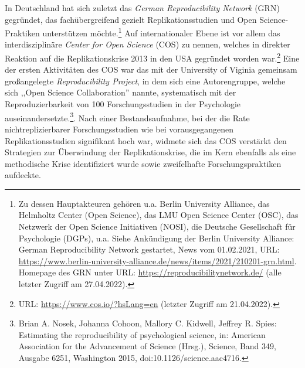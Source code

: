 In Deutschland hat sich zuletzt das \textit{German Reproducibility Network} (GRN) gegründet, das fachübergreifend gezielt Replikationsstudien und Open Science-Praktiken unterstützen möchte.\footnote{Zu dessen Hauptakteuren gehören u.a. Berlin University Alliance, das Helmholtz Center (Open Science), das LMU Open Science Center (OSC), das Netzwerk der Open Science Initiativen (NOSI), die Deutsche Gesellschaft für Psychologie (DGPs), u.a. Siehe Ankündigung der Berlin University Alliance: German Reproducibility Network gestartet, News vom 01.02.2021, URL: \url{https://www.berlin-university-alliance.de/news/items/2021/210201-grn.html}. Homepage des GRN unter URL: \url{https://reproducibilitynetwork.de/} (alle letzter Zugriff am 27.04.2022).} Auf internationaler Ebene ist vor allem das interdisziplinäre \textit{Center for Open Science} (COS) zu nennen, welches in direkter Reaktion auf die Replikationskrise 2013 in den USA gegründet worden war.\footnote{URL: \url{https://www.cos.io/?hsLang=en} (letzter Zugriff am 21.04.2022).} Eine der ersten Aktivitäten des COS war das mit der University of Viginia gemeinsam großangelegte \textit{Reproducibility Project}, in dem sich eine Autorengruppe, welche sich ,,Open Science Collaboration'' nannte, systematisch mit der Reproduzierbarkeit von 100 Forschungsstudien in der Psychologie auseinandersetzte.\footnote{Brian A. Nosek, Johanna Cohoon, Mallory C. Kidwell, Jeffrey R. Spies: Estimating the reproducibility of psychological science, in: American Association for the Advancement of Science (Hrsg.), Science, Band 349, Ausgabe 6251, Washington 2015, doi:10.1126/science.aac4716.}. Nach einer Bestandsaufnahme, bei der die Rate nichtreplizierbarer Forschungsstudien wie bei vorausgegangenen Replikationsstudien signifikant hoch war, widmete sich das COS verstärkt den Strategien zur Überwindung der Replikationskrise, die im Kern ebenfalls als eine methodische Krise identifiziert wurde sowie zweifelhafte Forschungspraktiken aufdeckte.

